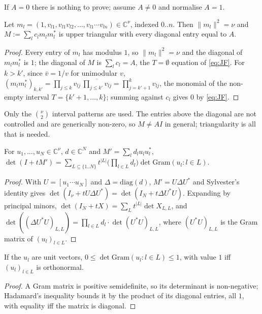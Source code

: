 If $A=0$ there is nothing to prove; assume $A\neq0$ and normalise $A=1$.

\begin{lemma}
\label{lem:chain}
Let $m_l=(1,v_{l1},v_{l1}v_{l2},\dots,v_{l1}\cdots v_{ln})\in\mathbb{C}^\nu$, indexed $0..n$. Then $\|m_l\|^2=\nu$
and $M:=\sum_lc_lm_lm_l^*$ is upper triangular with every diagonal entry equal to $A$.
\end{lemma}
\begin{proof}
Every entry of $m_l$ has modulus $1$, so $\|m_l\|^2=\nu$ and the diagonal of $m_lm_l^*$ is $1$; the diagonal
of $M$ is $\sum_lc_l=A$, the $T=\emptyset$ equation of \eqref{eq:JF}. For $k>k'$, since $\bar v=1/v$ for
unimodular $v$, $(m_lm_l^*)_{k,k'}=\prod_{j\le k}v_{lj}\,\overline{\prod_{j\le k'}v_{lj}}=\prod_{j=k'+1}^kv_{lj}$,
the monomial of the non-empty interval $T=\{k'+1,\dots,k\}$; summing against $c_l$ gives $0$ by \eqref{eq:JF}.
\end{proof}
Only the $\binom\nu2$ interval patterns are used. The entries above the diagonal are not controlled and are
generically non-zero, so $M\neq AI$ in general; triangularity is all that is needed.

\begin{lemma}
\label{lem:minor}
For $u_1,\dots,u_N\in\mathbb{C}^\nu$, $d\in\mathbb{C}^N$ and $M'=\sum_ld_lu_lu_l^*$,
$\det(I+tM')=\sum_{L\subseteq\{1..N\}}t^{|L|}\big(\prod_{l\in L}d_l\big)\det\mathrm{Gram}(u_l:l\in L)$.
\end{lemma}
\begin{proof}
With $U=[u_1\cdots u_N]$ and $\Delta=\mathrm{diag}(d)$, $M'=U\Delta U^*$ and Sylvester's identity gives
$\det(I_\nu+tU\Delta U^*)=\det(I_N+t\Delta U^*U)$. Expanding by principal minors,
$\det(I_N+tX)=\sum_Lt^{|L|}\det X_{L,L}$, and $\det((\Delta U^*U)_{L,L})=\prod_{l\in L}d_l\cdot\det(U^*U)_{L,L}$,
where $(U^*U)_{L,L}$ is the Gram matrix of $(u_l)_{l\in L}$.
\end{proof}

\begin{lemma}[Hadamard]
\label{lem:hadamard}
If the $u_l$ are unit vectors, $0\le\det\mathrm{Gram}(u_l:l\in L)\le1$, with value $1$ iff $(u_l)_{l\in L}$ is
orthonormal.
\end{lemma}
\begin{proof}
A Gram matrix is positive semidefinite, so its determinant is non-negative; Hadamard's inequality bounds it
by the product of its diagonal entries, all $1$, with equality iff the matrix is diagonal.
\end{proof}

